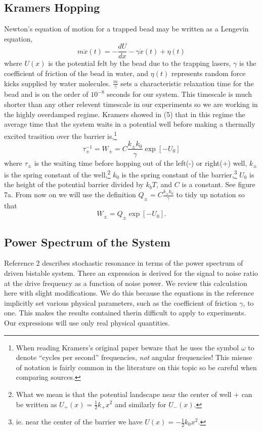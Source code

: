 \documentclass{report}
\begin{document}
\subsection{Kramers Hopping}
Newton's equation of motion for a trapped bead may be written as a Lengevin equation,
\begin{displaymath}
m\ddot{x}(t) = -\frac{dU}{dx} - \gamma \dot{x}(t) + \eta(t)
\end{displaymath}
where $U(x)$ is the potential felt by the bead due to the trapping lasers, $\gamma$ is the coefficient of friction of the bead in water, and $\eta(t)$ represents random force kicks supplied by water molecules. $\frac{m}{\gamma}$ sets a characteristic relaxation time for the bead and is on the order of $10^{-8}$ seconds for our system. This timescale is much shorter than any other relevent timescale in our experiments so we are working in the highly overdamped regime. Kramers showed in (5) that in this regime the average time that the system waits in a potential well before making a thermally excited trasition over the barrier is,\footnote{When reading Kramers's original paper beware that he uses the symbol $\omega$ to denote ``cycles per second'' frequencies, \emph{not} angular frequencies! This misuse of notation is fairly common in the literature on this topic so be careful when comparing sources.}
\begin{displaymath}
\tau_{\pm}^{-1} = W_{\pm} = C \frac{k_{\pm}k_0}{\gamma} \exp \left[-U_0 \right]
\end{displaymath}
where $\tau_{\pm}$ is the waiting time before hopping out of the left(-) or right(+) well, $k_{\pm}$ is the spring constant of the well,\footnote{What we mean is that the potential landscape near the center of well + can be written as $U_+(x) = \frac{1}{2}k_+x^2$ and similarly for $U_-(x)$.} $k_0$ is the spring constant of the barrier,\footnote{ie. near the center of the barrier we have $U(x) = -\frac{1}{2}k_0x^2$.} $U_0$ is the height of the potential barrier divided by $k_bT$, and $C$ is a constant. See figure 7a. From now on we will use the definition $Q_{\pm} = C \frac{k_{\pm}k_0}{\gamma}$ to tidy up notation so that
\begin{displaymath}
W_{\pm} = Q_{\pm} \exp \left[-U_0 \right].
\end{displaymath}

\subsection{Power Spectrum of the System}
Reference 2 describes stochastic resonance in terms of the power spectrum of driven bistable system. There an expression is derived for the signal to noise ratio at the drive frequency as a function of noise power. We review this calculation here with slight modifications. We do this because the equations in the reference implicitly set various physical parameters, such as the coefficient of friction $\gamma$, to one. This makes the results contained therin difficult to apply to experiments. Our expressions will use only real physical quantities.
\end{document}
